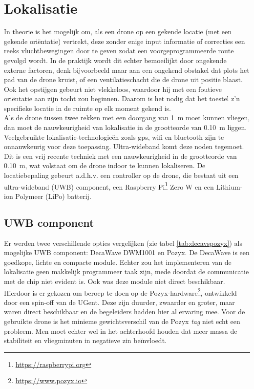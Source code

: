 \section{Lokalisatie} \label{sec:localization}
In theorie is het mogelijk om, als een drone op een gekende locatie (met een gekende oriëntatie) vertrekt, deze zonder enige input informatie of correcties een reeks vluchtbewegingen door te geven zodat een voorgeprogrammeerde route gevolgd wordt.
In de praktijk wordt dit echter bemoeilijkt door ongekende externe factoren, denk bijvoorbeeld maar aan een ongekend obstakel dat plots het pad van de drone kruist, of een ventilatieschacht die de drone uit positie blaast.
Ook het opstijgen gebeurt niet vlekkeloos, waardoor hij met een foutieve oriëntatie aan zijn tocht zou beginnen.
Daarom is het nodig dat het toestel z'n specifieke locatie in de ruimte op elk moment gekend is.\\

Als de drone tussen twee rekken met een doorgang van \SI{1}{\m} moet kunnen vliegen, dan moet de nauwkeurigheid van lokalisatie in de grootteorde van \SI{0.10}{\m} liggen.
Veelgebruikte lokalisatie-technologieën zoals gps, wifi en bluetooth zijn te onnauwkeurig voor deze toepassing.
Ultra-wideband komt deze noden tegemoet.
Dit is een vrij recente techniek met een nauwkeurigheid in de grootteorde van \SI{0.10}{\m}, wat volstaat om de drone indoor te kunnen lokaliseren.
De locatiebepaling gebeurt a.d.h.v. een controller op de drone, die bestaat uit een ultra-wideband (UWB) component, een Raspberry Pi\footnote{\url{https://raspberrypi.org}} Zero W en een Lithium-ion Polymeer (LiPo) batterij.\\

\subsection{UWB component} \label{sec:uwb}
Er werden twee verschillende opties vergelijken (zie tabel \ref{tab:decavspozyx}) als mogelijke UWB component: DecaWave DWM1001 en Pozyx.
De DecaWave is een goedkope, lichte en compacte module.
Echter zou het implementeren van de lokalisatie geen makkelijk programmeer taak zijn, mede doordat de communicatie met de chip niet evident is.
Ook was deze module niet direct beschikbaar. Hierdoor is er gekozen om beroep te doen op de Pozyx-hardware\footnote{\url{https://www.pozyx.io}}, ontwikkeld door een spin-off van de UGent. Deze zijn duurder, zwaarder en groter, maar waren direct beschikbaar en de begeleiders hadden hier al ervaring mee.
Voor de gebruikte drone is het minieme gewichtsverschil van de Pozyx \textit{tag} niet echt een probleem.
Men moet echter wel in het achterhoofd houden dat meer massa de stabiliteit en vliegminuten in negatieve zin beïnvloedt.\\

